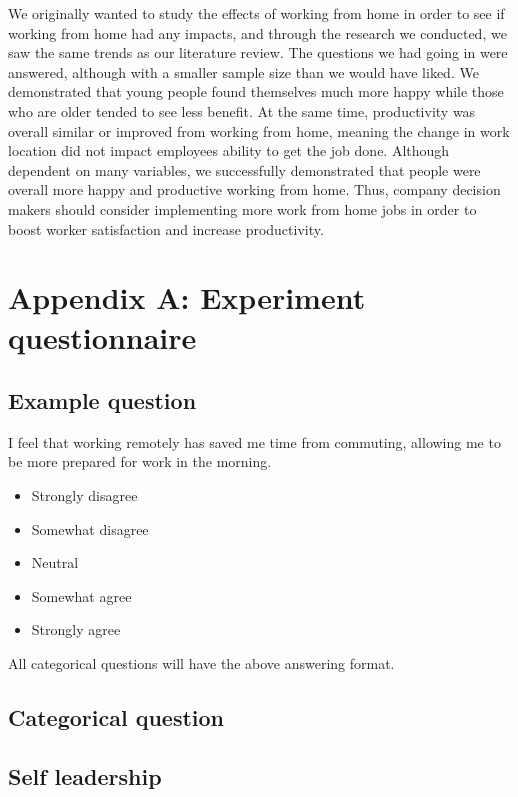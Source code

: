 \documentclass[12pt]{article}
\begin{document}
We originally wanted to study the effects of working from home in order to see if working from home had any impacts, and through the research we conducted, we saw the same trends as our literature review. The questions we had going in were answered, although with a smaller sample size than we would have liked. We demonstrated that young people found themselves much more happy while those who are older tended to see less benefit. At the same time, productivity was overall similar or improved from working from home, meaning the change in work location did not impact employees ability to get the job done. Although dependent on many variables, we successfully demonstrated that people were overall more happy and productive working from home. Thus, company decision makers should consider implementing more work from home jobs in order to boost worker satisfaction and increase productivity.





\appendix
\section*{Appendix A: Experiment questionnaire}

\subsection*{Example question}
I feel that working remotely has saved me time from commuting, allowing me to be more prepared for work in the morning. 
\begin{itemize}
  \item Strongly disagree
  \item Somewhat disagree
  \item Neutral
  \item Somewhat agree
  \item Strongly agree
\end{itemize}
All categorical questions will have the above answering format.
\subsection*{Categorical question}
\subsection*{Self leadership}
\end{document}
